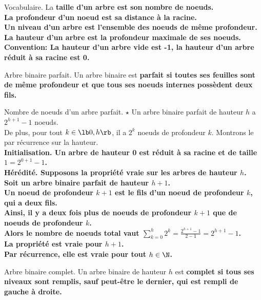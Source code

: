 \documentclass[french, 11pt]{article}
\begin{document}
\begin{defi}{Vocabulaire.}{}
    La \bf{taille} d'un arbre est son nombre de noeuds.\\
    La \bf{profondeur} d'un noeud est sa distance à la racine.\\
    Un \bf{niveau} d'un arbre est l'ensemble des noeuds de même profondeur.\\
    La \bf{hauteur} d'un arbre est la profondeur maximale de ses noeuds.\n
    \bf{Convention:} La hauteur d'un arbre vide est -1, la hauteur d'un arbre réduit à sa racine est 0.
\end{defi}

\begin{defi}{Arbre binaire parfait.}{}
    Un arbre binaire est \bf{parfait} si toutes ses feuilles sont de même profondeur et que tous ses noeuds internes possèdent deux fils.
\end{defi}

\begin{prop}{Nombre de noeuds d'un arbre parfait. $\star$}{}
    Un arbre binaire parfait de hauteur $h$ a $2^{h+1}-1$ noeuds.\\
    De plus, pour tout $k\in\lb0,h\rb$, il a $2^k$ noeuds de profondeur $k$.
    \tcblower
    Montrons le par récurrence sur la hauteur.\\
    \bf{Initialisation.} Un arbre de hauteur 0 est réduit à sa racine et de taille $1=2^{0+1}-1$.\\
    \bf{Hérédité.} Supposons la propriété vraie sur les arbres de hauteur $h$.\\
    Soit un arbre binaire parfait de hauteur $h+1$.\\
    Un noeud de profondeur $k+1$ est le fils d'un noeud de profondeur $k$, qui a deux fils.\\
    Ainsi, il y a deux fois plus de noeuds de profondeur $k+1$ que de noeuds de profondeur $k$.\\
    Alors le nombre de noeuds total vaut $\sum_{k=0}^h2^k=\frac{2^{h+1}-1}{2-1}=2^{h+1}-1$.\\
    La propriété est vraie pour $h+1$.\\
    Par récurrence, elle est vraie pour tout $h\in\N$.
\end{prop}

\begin{defi}{Arbre binaire complet.}{}
    Un arbre binaire de hauteur $h$ est \bf{complet} si tous ses niveaux sont remplis, sauf peut-être le dernier, qui est rempli de gauche à droite.
\end{defi}
\end{document}
